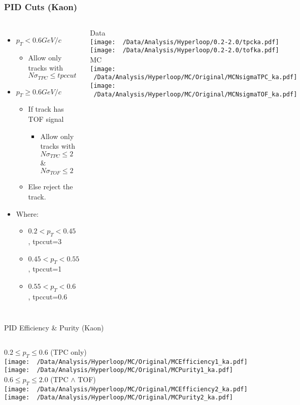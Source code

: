 \documentclass{beamer}
\begin{document}
\begin{frame}
	\frametitle{PID Cuts (Kaon)}
	\begin{columns}
		\begin{itemize}
			\item $p_T<0.6GeV/c$
			\begin{itemize}
				\item Allow only tracks with $N\sigma_{TPC} \leq tpccut$
			\end{itemize}
			\item $p_T\geq 0.6GeV/c$
			\begin{itemize}
				\item If track has TOF signal
				\begin{itemize}
					\item Allow  only tracks with $N\sigma_{TPC} \leq 2$ \& $N\sigma_{TOF}\leq 2$
				\end{itemize}
				\item Else reject the track.
			\end{itemize}
			\item Where:
			\begin{itemize}
				\item $0.2<p_T<0.45$ , tpccut=3
				\item $0.45<p_T<0.55$ , tpccut=1
				\item $0.55<p_T<0.6$ , tpccut=0.6
			\end{itemize}
		\end{itemize}
		\centering
		{\tiny Data}\\
		\texttt{[image: ~/Data/Analysis/Hyperloop/0.2-2.0/tpcka.pdf]}\\
		\texttt{[image: ~/Data/Analysis/Hyperloop/0.2-2.0/tofka.pdf]}\\
		{\tiny MC}\\
		\texttt{[image: ~/Data/Analysis/Hyperloop/MC/Original/MCNsigmaTPC\_ka.pdf]}\\
		\texttt{[image: ~/Data/Analysis/Hyperloop/MC/Original/MCNsigmaTOF\_ka.pdf]}\\
	\end{columns}
\end{frame}
\begin{frame}{PID Efficiency \& Purity (Kaon)}
	\begin{columns}
		\centering
		$0.2\leq p_T \leq 0.6$ (TPC only)\\
		\texttt{[image: ~/Data/Analysis/Hyperloop/MC/Original/MCEfficiency1\_ka.pdf]}\\
		\texttt{[image: ~/Data/Analysis/Hyperloop/MC/Original/MCPurity1\_ka.pdf]}
		\centering
		$0.6\leq p_T \leq 2.0$ (TPC $\land$ TOF)\\
		\texttt{[image: ~/Data/Analysis/Hyperloop/MC/Original/MCEfficiency2\_ka.pdf]}\\
		\texttt{[image: ~/Data/Analysis/Hyperloop/MC/Original/MCPurity2\_ka.pdf]}
	\end{columns}
\end{frame}
\end{document}
